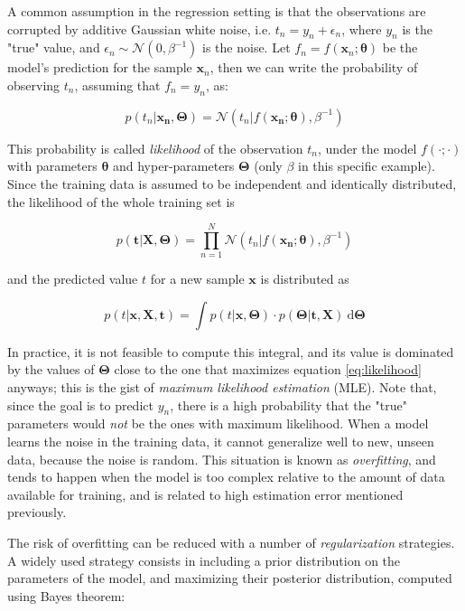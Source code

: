 \documentclass[a4paper]{book}
\begin{document}
A common assumption in the regression setting is that the observations are corrupted by additive Gaussian white noise, i.e. $t_n=y_n+\epsilon_n$, where $y_n$ is the "true" value, and $\epsilon_n\sim\mathcal{N}(0,\beta^{-1})$ is the noise. Let $f_n=f(\bm x_n;\bm{\theta})$ be the model's prediction for the sample $\bm x_n$, then we can write the probability of observing $t_n$, assuming that $f_n=y_n$, as:

\begin{equation}
\label{eq:model_pred_distrib}
p(t_n\vert \bm{x_n},\bm\Theta)=\mathcal{N}(t_n\vert f(\bm{x_n};\bm\theta),\beta^{-1})
\end{equation}

This probability is called \emph{likelihood} of the observation $t_n$, under the model $f(\cdot;\cdot)$ with parameters $\bm{\theta}$ and hyper-parameters $\bm\Theta$ (only $\beta$ in this specific example). Since the training data is assumed to be independent and identically distributed, the likelihood of the whole training set is

\begin{equation}
\label{eq:likelihood}
p(\bm{t}\vert\bm{X}, \bm\Theta)=\prod_{n=1}^N  \mathcal{N}(t_n\vert f(\bm{x_n};\bm\theta),\beta^{-1})
\end{equation}

\noindent and the predicted value $t$ for a new sample $\bm x$ is distributed as

\begin{equation}
p(t\vert \bm x, \bm X, \bm t)=\int
p(t\vert\bm x,\bm\Theta)\cdot p(\bm\Theta\vert \bm t, \bm X)\ \text{d}\bm\Theta 
\end{equation}

In practice, it is not feasible to compute this integral, and its value is dominated by the values of $\bm\Theta$ close to the one that maximizes equation \ref{eq:likelihood} anyways; this is the gist of \emph{maximum likelihood estimation} (MLE). Note that, since the goal is to predict $y_n$, there is a high probability that the "true" parameters would \emph{not} be the ones with maximum likelihood. When a model learns the noise in the training data, it cannot generalize well to new, unseen data, because the noise is random. This situation is known as \emph{overfitting}, and tends to happen when the model is too complex relative to the amount of data available for training, and is related to high estimation error mentioned previously.

The risk of overfitting can be reduced with a number of \emph{regularization} strategies. A widely used strategy consists in including a prior distribution on the parameters of the model, and maximizing their posterior distribution, computed using Bayes theorem:
\end{document}

